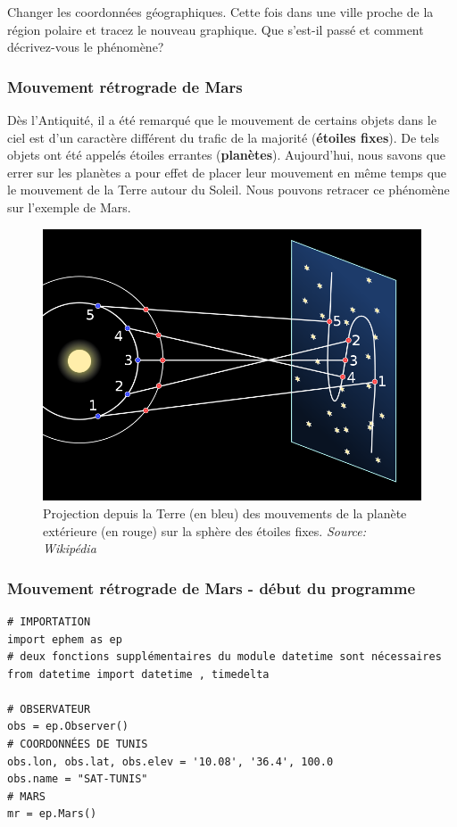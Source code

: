 \documentclass{beamer}
\newenvironment{doconceexercise}{}{}
\newcounter{doconceexercisecounter}
\newcounter{doconce:movie:counter}
\begin{document}
\begin{frame}

\begin{doconceexercise}



Changer les coordonnées géographiques. Cette fois dans une ville proche de la région polaire et tracez le nouveau graphique. Que s'est-il passé et comment décrivez-vous le phénomène?

\end{doconceexercise}
\end{frame}

\begin{frame}
\frametitle{Mouvement rétrograde de Mars}

Dès l'Antiquité, il a été remarqué que le mouvement de certains objets dans le ciel est d'un caractère différent du trafic de la majorité (\textbf{étoiles fixes}). De tels objets ont été appelés étoiles errantes (\textbf{planètes}). Aujourd'hui, nous savons que errer sur les planètes a pour effet de placer leur mouvement en même temps que le mouvement de la Terre autour du Soleil. Nous pouvons retracer ce phénomène sur l'exemple de Mars.

\begin{figure}[!ht]  %
  \centerline{\includegraphics[width=0.5\linewidth]{figs/retro_mars.png}}
  \caption{
  Projection depuis la Terre (en bleu) des mouvements de la planète extérieure (en rouge) sur la sphère des étoiles fixes. \emph{Source: Wikipédia}
  }
\end{figure}
\end{frame}

\begin{frame}
\frametitle{Mouvement rétrograde de Mars - début du programme}

\begin{verbatim}
# IMPORTATION
import ephem as ep
# deux fonctions supplémentaires du module datetime sont nécessaires
from datetime import datetime , timedelta

# OBSERVATEUR
obs = ep.Observer()
# COORDONNÉES DE TUNIS
obs.lon, obs.lat, obs.elev = '10.08', '36.4', 100.0
obs.name = "SAT-TUNIS"
# MARS
mr = ep.Mars()
\end{verbatim}
\end{frame}
\end{document}
